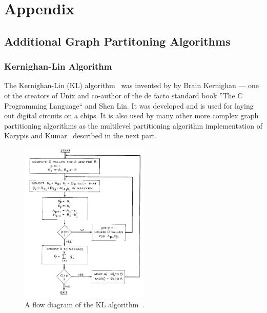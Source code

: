  \chapter{Appendix}
    \section{Additional Graph Partitoning Algorithms}
        \subsection*{Kernighan-Lin Algorithm}\label{kla}
            The Kernighan-Lin (KL) algorithm~\autocite{kl} was invented by by Brain Kernighan --- one of the creators of Unix and co-author of the de facto standard book ''The C Programming Language`` and  Shen Lin.
            It was developed and is used for laying out digital circuits on a chips. 
            It is also used by many other more complex graph partitioning algorithms as the multilevel partitioning algorithm implementation of Karypis and Kumar~\autocite{karypis} described in the next part.
            
            \begin{figure}[htp]
                \begin{center}
                    \includegraphics[keepaspectratio,width=0.55\textwidth]{img/03-graphs/kl.png}
                \end{center}
                \caption{A flow diagram of the KL algorithm~\autocite{kl}.} 
                \label{kl-fig}
            \end{figure}
                
